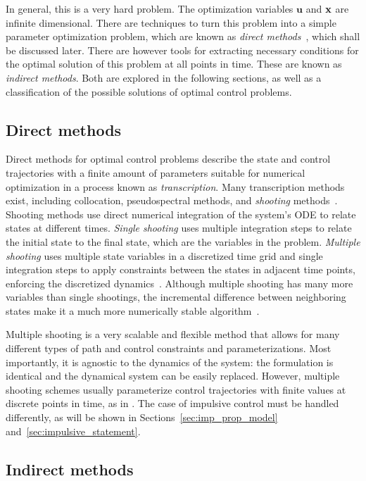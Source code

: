 In general, this is a very hard problem. The optimization variables \(\mathbf{u}\) and \(\mathbf{x}\) are infinite dimensional. There are techniques to turn this problem into a simple parameter optimization problem, which are known as \textit{direct methods}~\cite{Conway_2010}, which shall be discussed later. There are however tools for extracting necessary conditions for the optimal solution of this problem at all points in time. These are known as \textit{indirect methods}. Both are explored in the following sections, as well as a classification of the possible solutions of optimal control problems.

\subsection{Direct methods}

Direct methods for optimal control problems describe the state and control trajectories with a finite amount of parameters suitable for numerical optimization in a process known as \textit{transcription}. Many transcription methods exist, including collocation, pseudospectral methods, and \textit{shooting} methods~\cite{Conway_2010}. Shooting methods use direct numerical integration of the system's ODE to relate states at different times. \textit{Single shooting} uses multiple integration steps to relate the initial state to the final state, which are the variables in the problem. \textit{Multiple shooting} uses multiple state variables in a discretized time grid and single integration steps to apply constraints between the states in adjacent time points, enforcing the discretized dynamics~\cite{numerical_recipes}. Although multiple shooting has many more variables than single shootings, the incremental difference between neighboring states make it a much more numerically stable algorithm~\cite{ross2015primer}.

Multiple shooting is a very scalable and flexible method that allows for many different types of path and control constraints and parameterizations. Most importantly, it is agnostic to the dynamics of the system: the formulation is identical and the dynamical system can be easily replaced. However, multiple shooting schemes usually parameterize control trajectories with finite values at discrete points in time, as in . The case of impulsive control must be handled differently, as will be shown in Sections~\ref{sec:imp_prop_model} and~\ref{sec:impulsive_statement}.

\subsection{Indirect methods}

